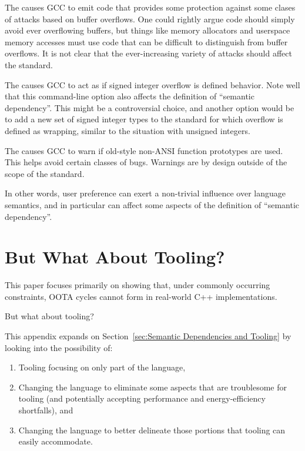 \documentclass[10]{article}
\begin{document}
The  causes GCC to emit code that provides
some protection against some clases of attacks based on buffer overflows.
One could rightly argue code should simply avoid ever overflowing buffers,
but things like memory allocators and userspace memory accesses must
use code that can be difficult to distinguish from buffer overflows.
It is not clear that the ever-increasing variety of attacks should
affect the standard.

The  causes GCC to act as if signed integer
overflow is defined behavior.
Note well that this command-line option also affects the definition of
``semantic dependency''.
This might be a controversial choice, and another option would be to add
a new set of signed integer types to the standard for which overflow is
defined as wrapping, similar to the situation with unsigned integers.

The  causes GCC to warn if old-style
non-ANSI function prototypes are used.
This helps avoid certain classes of bugs.
Warnings are by design outside of the scope of the standard.

In other words, user preference can exert a non-trivial influence over
language semantics, and in particular can affect some aspects of the
definition of ``semantic dependency''.

\clearpage

\section{But What About Tooling?}
\label{sec:But What About Tooling?}

This paper focuses primarily on showing that, under commonly occurring
constraints, OOTA cycles cannot form in real-world C++ implementations.

But what about tooling?

This appendix expands on
Section~\ref{sec:Semantic Dependencies and Tooling}
by looking into the possibility of:

\begin{enumerate}
\item	Tooling focusing on only part of the language,
\item	Changing the language to eliminate some aspects that are
	troublesome for tooling (and potentially accepting performance
	and energy-efficiency shortfalls), and
\item	Changing the language to better delineate those portions that
	tooling can easily accommodate.
\end{enumerate}
\end{document}
